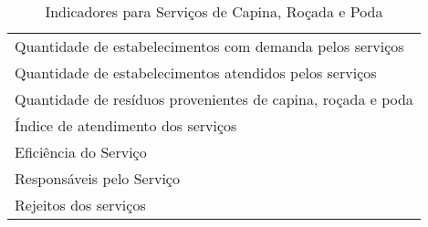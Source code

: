 \begin{table}[h!]
  \centering
  \caption{Indicadores para Serviços de Capina, Roçada e Poda}
\begin{tabular}{|p{25em}|}
	\rowcolor[rgb]{ .984,  .831,  .706} \multicolumn{1}{P{25em}}{SERVIÇOS DE CAPINA, ROÇADA E PODA} \\
	\midrule
	Quantidade de estabelecimentos com demanda pelos serviços \\
	\midrule
	Quantidade de estabelecimentos atendidos pelos serviços \\
	\midrule
	Quantidade de resíduos provenientes de capina, roçada e poda \\
	\midrule
	Índice de atendimento dos serviços \\
	\midrule
	Eficiência do Serviço \\
	\midrule
	Responsáveis pelo Serviço \\
	\midrule
	Rejeitos dos serviços \\
	\bottomrule
\end{tabular}%

  \label{tab:ind_capina}%
\end{table}%
